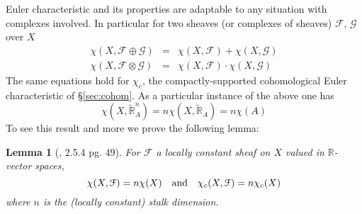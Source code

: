 \documentclass{psapm-l}
\newtheorem{lemma}[theorem]{Lemma}
\theoremstyle{definition}
\theoremstyle{remark}
\numberwithin{equation}{section}
\begin{document}
Euler characteristic and its properties are adaptable to any situation with complexes involved. In particular for two sheaves (or complexes of sheaves) ${{\mathcal F}}$, $\mathcal{G}$ over $X$
\begin{eqnarray*}
	\chi(X,{{\mathcal F}}\oplus\mathcal{G})&=&\chi(X,{{\mathcal F}})+\chi(X,\mathcal{G}) \\
	\chi(X,{{\mathcal F}}\otimes\mathcal{G})&=&\chi(X,{{\mathcal F}})\cdot\chi(X,\mathcal{G})
\end{eqnarray*}
The same equations hold for $\chi_c$, the compactly-supported cohomological Euler characteristic of \S\ref{sec:cohom}. As a particular instance of the above one has
\[
	\chi(X,\widetilde{{\mathbb R}}^n_A)=n\chi(X,\widetilde{{\mathbb R}}_A)=n\chi(A)
\]
To see this result and more we prove the following lemma:
\begin{lemma}[\cite{Dimca}, 2.5.4 pg. 49]
For ${{\mathcal F}}$ a locally constant sheaf on $X$ valued in ${{\mathbb R}}$-vector spaces,
\[
	\chi(X,{{\mathcal F}})=n\chi(X)
    \quad {\rm and } \quad
    \chi_c(X,{{\mathcal F}})=n\chi_c(X)
\]
where $n$ is the (locally constant) stalk dimension.
\end{lemma}
\end{document}
